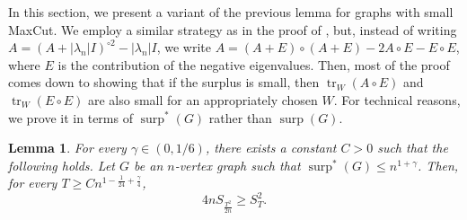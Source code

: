 \documentclass[11pt]{article}
\theoremstyle{plain}
\newtheorem{lemma}[theorem]{Lemma}
\theoremstyle{definition}
\DeclareMathOperator{\surp}{surp}
\DeclareMathOperator{\trace}{tr}
\begin{document}
In this section, we present a variant of the previous lemma for graphs with small MaxCut. 
We employ a similar strategy as in the proof of , but, instead of writing $A=(A+|\lambda_n|I)^{\circ 2}-|\lambda_n| I$, we write $A=(A+E)\circ (A+E)-2A\circ E-E\circ E$, where $E$ is the contribution of the negative eigenvalues. Then, most of the proof comes down to showing that if the surplus is small, then $\trace_W(A\circ E)$ and $\trace_W(E\circ E)$ are also small for an appropriately chosen $W$.
For technical reasons, we prove it in terms of $\surp^*(G)$ rather than $\surp(G)$.

\begin{lemma}\label{lemma:main_MaxCut}
For every $\gamma \in (0,1/6)$, there exists a constant $C>0$ such that the following holds.
Let $G$ be an $n$-vertex graph such that $\surp^*(G)\leq n^{1+\gamma}$. 
Then, for every $T\geq Cn^{1-\frac{1}{24}+\frac{\gamma}{4}}$,
$$4nS_{\frac{T^2}{2n}}\geq S_T^2.$$
\end{lemma}
\end{document}
